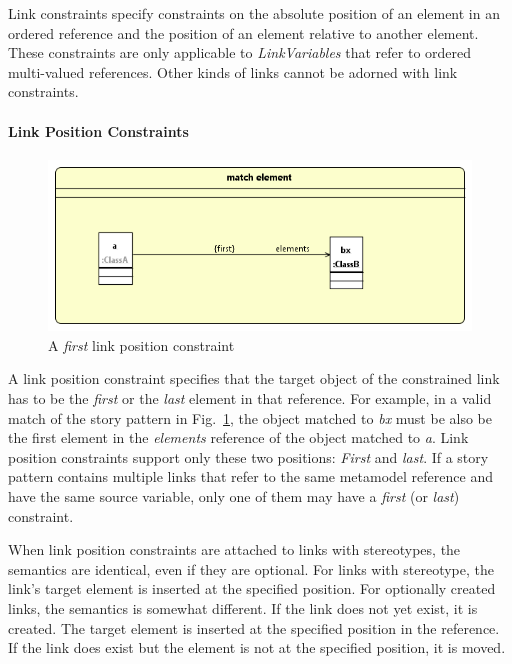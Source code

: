 


Link constraints specify constraints on the absolute position of an element in an ordered reference and the position of an element relative to another element. These constraints are only applicable to \emph{LinkVariables} that refer to ordered multi-valued references. Other kinds of links cannot be adorned with link constraints.

\paragraph{Link Position Constraints}

\begin{figure}[htb]
\center
\includegraphics[width=0.75\columnwidth]{figures/linkPositionConstraint1.png}
\caption{A \emph{first} link position constraint}
\label{fig:linkPositionConstraints:linkPositionConstraint1}
\end{figure}

A link position constraint specifies that the target object of the constrained link has to be the \emph{first} or the \emph{last} element in that reference. For example, in a valid match of the story pattern in Fig.~\ref{fig:linkPositionConstraints:linkPositionConstraint1}, the object matched to \emph{bx} must be also be the first element in the \emph{elements} reference of the object matched to \emph{a}. Link position constraints support only these two positions: \emph{First} and \emph{last}. If a story pattern contains multiple links that refer to the same metamodel reference and have the same source variable, only one of them may have a \emph{first} (or \emph{last}) constraint.

When link position constraints are attached to links with \destroy stereotypes, the semantics are identical, even if they are optional. For links with \create stereotype, the link's target element is inserted at the specified position. For optionally created links, the semantics is somewhat different. If the link does not yet exist, it is created. The target element is inserted at the specified position in the reference. If the link does exist but the element is not at the specified position, it is moved.

